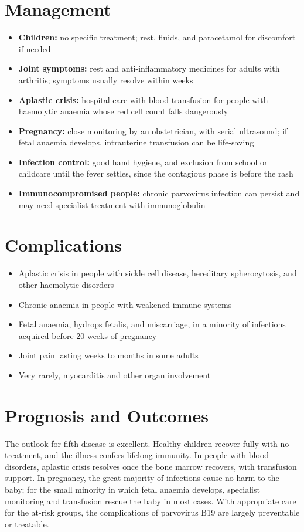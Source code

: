 \section*{Management}
\begin{itemize}
    \item \textbf{Children:} no specific treatment; rest, fluids, and paracetamol for discomfort if needed
    \item \textbf{Joint symptoms:} rest and anti-inflammatory medicines for adults with arthritis; symptoms usually resolve within weeks
    \item \textbf{Aplastic crisis:} hospital care with blood transfusion for people with haemolytic anaemia whose red cell count falls dangerously
    \item \textbf{Pregnancy:} close monitoring by an obstetrician, with serial ultrasound; if fetal anaemia develops, intrauterine transfusion can be life-saving
    \item \textbf{Infection control:} good hand hygiene, and exclusion from school or childcare until the fever settles, since the contagious phase is before the rash
    \item \textbf{Immunocompromised people:} chronic parvovirus infection can persist and may need specialist treatment with immunoglobulin
\end{itemize}

\section*{Complications}
\begin{itemize}
    \item Aplastic crisis in people with sickle cell disease, hereditary spherocytosis, and other haemolytic disorders
    \item Chronic anaemia in people with weakened immune systems
    \item Fetal anaemia, hydrops fetalis, and miscarriage, in a minority of infections acquired before 20 weeks of pregnancy
    \item Joint pain lasting weeks to months in some adults
    \item Very rarely, myocarditis and other organ involvement
\end{itemize}

\section*{Prognosis and Outcomes}
The outlook for fifth disease is excellent. Healthy children recover fully with no treatment, and the illness confers lifelong immunity. In people with blood disorders, aplastic crisis resolves once the bone marrow recovers, with transfusion support. In pregnancy, the great majority of infections cause no harm to the baby; for the small minority in which fetal anaemia develops, specialist monitoring and transfusion rescue the baby in most cases. With appropriate care for the at-risk groups, the complications of parvovirus B19 are largely preventable or treatable.

